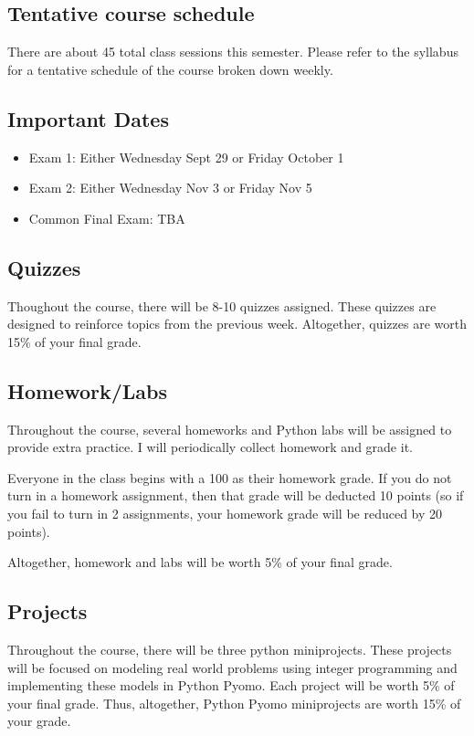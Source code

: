 \documentclass[letterpaper,hidelinks,oneside,11pt]{article}%
\begin{document}
\subsection*{Tentative course schedule} 

There are about 45 total class sessions this semester. Please refer to the syllabus for a tentative schedule of the course broken down weekly.

\subsection*{Important Dates}
\begin{itemize}
\item Exam 1: Either Wednesday Sept 29 or Friday October 1
\item Exam 2: Either Wednesday Nov 3 or Friday Nov 5
\item Common Final Exam: TBA
\end{itemize}

\subsection*{Quizzes}

Thoughout the course, there will be 8-10 quizzes assigned. These quizzes are designed to reinforce topics from the previous week. Altogether, quizzes are worth 15\% of your final grade.


\subsection*{Homework/Labs}
Throughout the course, several homeworks and Python labs will be assigned to provide extra practice. I will periodically collect homework and grade it.

Everyone in the class begins with a 100 as their homework grade. If you do not turn in a homework assignment, then that grade will be deducted 10 points (so if you fail to turn in 2 assignments, your homework grade will be reduced by 20 points).

Altogether, homework and labs will be worth 5\% of your final grade.

\subsection*{Projects}

Throughout the course, there will be three python miniprojects. These projects will be focused on modeling real world problems using integer programming and implementing these models in Python Pyomo. Each project will be worth 5\% of your final grade. Thus, altogether, Python Pyomo miniprojects are worth 15\% of your grade.
\end{document}
